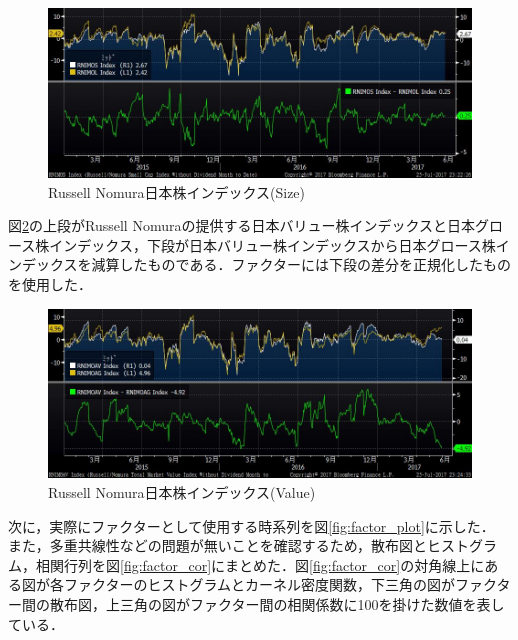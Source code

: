 ﻿\documentclass[11pt]{jreport}
\begin{document}
\begin{figure}[H]
	\begin{center}
		\includegraphics[width=15cm]{./fig/Size.jpg}
		\caption{Russell Nomura日本株インデックス(Size)}
		\label{fig:Size}
	\end{center}
\end{figure}
図\ref{fig:Value}の上段がRussell Nomuraの提供する日本バリュー株インデックスと日本グロース株インデックス，下段が日本バリュー株インデックスから日本グロース株インデックスを減算したものである．ファクターには下段の差分を正規化したものを使用した．
\begin{figure}[H]
	\begin{center}
		\includegraphics[width=15cm]{./fig/Value.jpg}
		\caption{Russell Nomura日本株インデックス(Value)}
		\label{fig:Value}
	\end{center}
\end{figure}

次に，実際にファクターとして使用する時系列を図\ref{fig:factor_plot}に示した．
また，多重共線性などの問題が無いことを確認するため，散布図とヒストグラム，相関行列を図\ref{fig:factor_cor}にまとめた．図\ref{fig:factor_cor}の対角線上にある図が各ファクターのヒストグラムとカーネル密度関数，下三角の図がファクター間の散布図，上三角の図がファクター間の相関係数に100を掛けた数値を表している．
\end{document}
